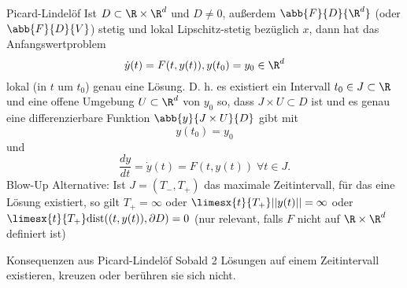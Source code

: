 \begin{karte}{Picard-Lindelöf}
    Ist \(D\subset \R\times \R^d \) und \(D\neq 0\), außerdem 
    \(\abb{F}{D}{\R^d}\) (oder \(\abb{F}{D}{V}\)) stetig und lokal 
    Lipschitz-stetig bezüglich \(x\), dann hat das Anfangswertproblem 
    \[ \dot{y}(t) = F(t,y(t)), y(t_0) = y_0 \in \R^d \]
    lokal (in \(t\) um \(t_0\)) genau eine Lösung. D. h. es existiert ein 
    Intervall \(t_0 \in J \subset \R\) und eine offene Umgebung \(U \subset \R^d\) 
    von \(y_0\) so, dass \(J \times U \subset D\) ist und es genau eine 
    differenzierbare Funktion 
    \(\abb{y}{J\times U}{D}\) gibt mit 
    \[ y(t_0)= y_0 \]
    und 
    \[ \frac{dy}{dt} = \dot{y}(t) = F(t,y(t)) \;\forall t\in J. \]
    Blow-Up Alternative: Ist \(J = (T_-, T_+)\) das maximale 
    Zeitintervall, für das eine Lösung existiert, so gilt 
    \(T_+ = \infty\) oder \(\limesx{t}{T_+} ||y(t)|| = \infty \) 
    oder \\
    \( \limesx{t}{T_+} \mathrm{dist}((t,y(t)), \partial D) = 0 \) 
    (nur relevant, falls \(F\) nicht auf \(\R\times \R^d\) definiert ist)
\end{karte}

\begin{karte}{Konsequenzen aus Picard-Lindelöf}
    Sobald 2 Lösungen auf einem Zeitintervall existieren, kreuzen oder 
    berühren sie sich nicht.
\end{karte}